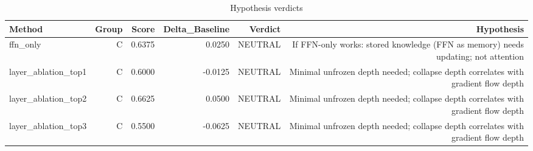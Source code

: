 \begin{table}[htbp]
\centering
\caption{Hypothesis verdicts}
\label{tab:hyp-verdicts}
\begin{tabular}{lrrrrr}
\toprule
\textbf{Method} & \textbf{Group} & \textbf{Score} & \textbf{Delta\_Baseline} & \textbf{Verdict} & \textbf{Hypothesis} \\
\midrule
ffn\_only & C & 0.6375 & 0.0250 & NEUTRAL & If FFN-only works: stored knowledge (FFN as memory) needs updating; not attention \\
layer\_ablation\_top1 & C & 0.6000 & -0.0125 & NEUTRAL & Minimal unfrozen depth needed; collapse depth correlates with gradient flow depth \\
layer\_ablation\_top2 & C & 0.6625 & 0.0500 & NEUTRAL & Minimal unfrozen depth needed; collapse depth correlates with gradient flow depth \\
layer\_ablation\_top3 & C & 0.5500 & -0.0625 & NEUTRAL & Minimal unfrozen depth needed; collapse depth correlates with gradient flow depth \\
\bottomrule
\end{tabular}
\end{table}